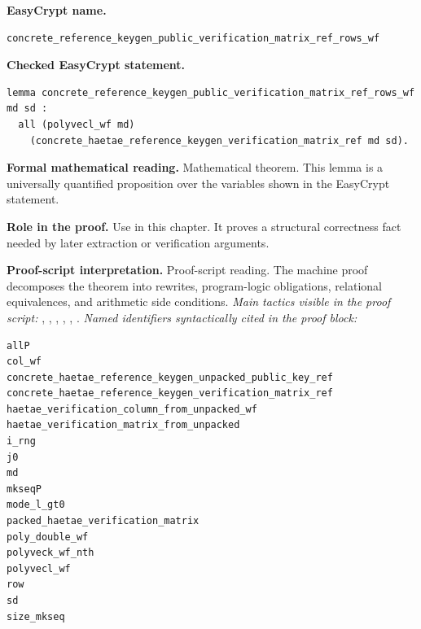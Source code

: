 \begin{formaltheorem}
\noindent\textbf{EasyCrypt name.}
\begin{lstlisting}[language=EasyCrypt,basicstyle=\ttfamily\scriptsize]
concrete_reference_keygen_public_verification_matrix_ref_rows_wf
\end{lstlisting}
\noindent\textbf{Checked EasyCrypt statement.}
\begin{lstlisting}[language=EasyCrypt,basicstyle=\ttfamily\scriptsize]
lemma concrete_reference_keygen_public_verification_matrix_ref_rows_wf md sd :
  all (polyvecl_wf md)
    (concrete_haetae_reference_keygen_verification_matrix_ref md sd).
\end{lstlisting}
\noindent\textbf{Formal mathematical reading.}
Mathematical theorem. This lemma is a universally quantified proposition over the variables shown in the EasyCrypt statement.

\noindent\textbf{Role in the proof.}
Use in this chapter. It proves a structural correctness fact needed by later extraction or verification arguments.

\noindent\textbf{Proof-script interpretation.}
Proof-script reading. The machine proof decomposes the theorem into rewrites, program-logic obligations, relational equivalences, and arithmetic side conditions.
\emph{Main tactics visible in the proof script:} , , , , , .
\emph{Named identifiers syntactically cited in the proof block:}
\begin{lstlisting}[language=EasyCrypt,basicstyle=\ttfamily\scriptsize]
allP
col_wf
concrete_haetae_reference_keygen_unpacked_public_key_ref
concrete_haetae_reference_keygen_verification_matrix_ref
haetae_verification_column_from_unpacked_wf
haetae_verification_matrix_from_unpacked
i_rng
j0
md
mkseqP
mode_l_gt0
packed_haetae_verification_matrix
poly_double_wf
polyveck_wf_nth
polyvecl_wf
row
sd
size_mkseq
\end{lstlisting}

\end{formaltheorem}

